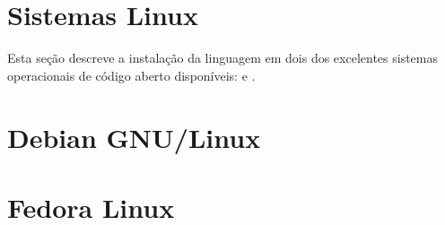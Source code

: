 \section{Sistemas Linux}\label{sec:instalação-em-sistemas-linux}

Esta seção descreve a instalação da linguagem \python{} em dois dos excelentes
sistemas operacionais de código aberto disponíveis: \debiangnulinux{} e
\fedoraproject.

\section{Debian GNU/Linux}\label{ssec:debian-gnu/linux}

\section{Fedora Linux}\label{ssec:fedora-linux}


